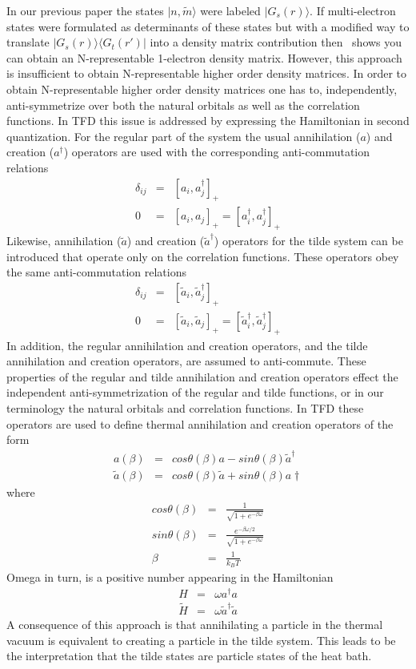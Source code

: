 \documentclass[pra,nofootinbib]{revtex4-1}
\begin{document}
In our previous paper the states $|n,\tilde{m}\rangle$ were labeled $|G_s(r)\rangle$.
If multi-electron states were formulated as determinants of these states but with 
a modified way to translate $|G_s(r)\rangle\langle G_t(r')|$ into a density matrix
contribution then~\cite{van_Dam_2016} shows you can obtain an N-representable 
1-electron density matrix. However, this approach is insufficient 
to obtain N-representable higher order density matrices. In order to obtain
N-representable higher order density matrices one has to, independently, anti-symmetrize
over both the natural orbitals as well as the correlation functions. In TFD this issue
is addressed by expressing the Hamiltonian in second quantization. For the regular part
of the system the usual annihilation ($a$) and creation ($a^\dagger$) operators are used
with the corresponding anti-commutation relations
\begin{eqnarray}
  \delta_{ij} &=& [a_i,a_j^\dagger]_+ \\
  0 &=& [a_i,a_j]_+ = [a_i^\dagger,a_j^\dagger]_+
\end{eqnarray}
Likewise, annihilation ($\tilde{a}$) and creation ($\tilde{a}^\dagger$) operators for
the tilde system can be introduced that operate only on the correlation functions.
These operators obey the same anti-commutation relations
\begin{eqnarray}
  \delta_{ij} &=& [\tilde{a}_i,\tilde{a}_j^\dagger]_+ \\
  0 &=& [\tilde{a}_i,\tilde{a}_j]_+ = [\tilde{a}_i^\dagger,\tilde{a}_j^\dagger]_+
\end{eqnarray}
In addition, the regular annihilation and creation operators, and the tilde annihilation and
creation operators, are assumed to anti-commute. These properties of the regular and tilde
annihilation and creation operators effect the independent anti-symmetrization of the
regular and tilde functions, or in our terminology the natural orbitals and correlation
functions.
In TFD these operators are used to define thermal annihilation and creation operators of the
form
\begin{eqnarray}
  a(\beta)         &=& cos\theta(\beta)a         - sin\theta(\beta)\tilde{a}^\dagger \\
  \tilde{a}(\beta) &=& cos\theta(\beta)\tilde{a} + sin\theta(\beta)a\dagger 
\end{eqnarray}
where
\begin{eqnarray}
  cos\theta(\beta) &=& \frac{1}{\sqrt{1+e^{-\beta\omega}}} \\
  sin\theta(\beta) &=& \frac{e^{-\beta\omega/2}}{\sqrt{1+e^{-\beta\omega}}} \\
  \beta            &=& \frac{1}{k_B T}
\end{eqnarray}
Omega in turn, is a positive number appearing in the Hamiltonian
\begin{eqnarray}
  H         &=& \omega a^\dagger a \\
  \tilde{H} &=& \omega \tilde{a}^\dagger \tilde{a}
\end{eqnarray}
A consequence of this approach is that annihilating a particle in the thermal vacuum is
equivalent to creating a particle in the tilde system. This leads to be the interpretation 
that the tilde states are particle states of the heat bath.
\end{document}
